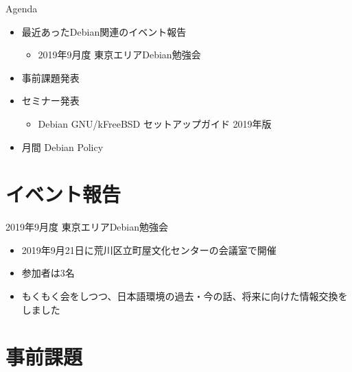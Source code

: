 \begin{frame}{Agenda}
 \begin{minipage}[t]{0.45\hsize}
  \begin{itemize}
  \item 最近あったDebian関連のイベント報告
    \begin{itemize}
    \item 2019年9月度 東京エリアDebian勉強会
    \end{itemize}
  \item 事前課題発表
  \end{itemize}
 \end{minipage}
 \begin{minipage}[t]{0.45\hsize}
   \begin{itemize}
   \item セミナー発表
     \begin{itemize}
     \item Debian GNU/kFreeBSD セットアップガイド 2019年版
     \end{itemize}
  \item 月間 Debian Policy
  \end{itemize}
 \end{minipage}
\end{frame}

\section{イベント報告}

\begin{frame}{2019年9月度 東京エリアDebian勉強会}
\begin{itemize}
\item 2019年9月21日に荒川区立町屋文化センターの会議室で開催
\item 参加者は3名
\item もくもく会をしつつ、日本語環境の過去・今の話、将来に向けた情報交換をしました
\end{itemize} 
\end{frame}


\section{事前課題}


{\footnotesize
 
}

%

